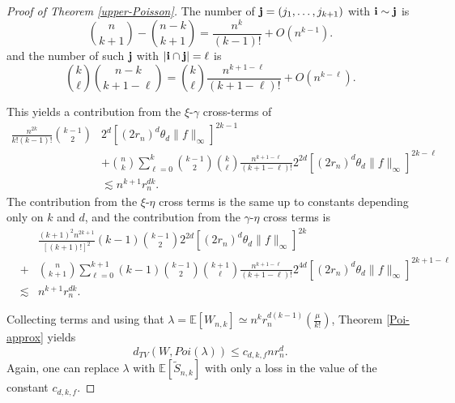 \documentclass{amsart}
\theoremstyle{definition}
\newcommand{\E}{\mathbb{E}}
\newcommand{\s}{\widetilde{S}}
\renewcommand{\1}{\mathbb{1}}
\begin{document}
\begin{proof}[Proof of Theorem \ref{upper-Poisson}]
The number of ${\bf j}=(j_1,\ldots,j_{k+1})$ with ${\bf i}\sim{\bf j}$
is
$$\binom{n}{k+1}-\binom{n-k}{k+1}=\frac{n^k}{(k-1)!}+O(n^{k-1}).$$
and the number of such ${\bf j}$ with $|{\bf i}\cap{\bf j}|=\ell$ is
$$\binom{k}{\ell}\binom{n-k}{k+1-\ell}=\binom{k}{\ell}\frac{n^{k+1-\ell}}{
(k+1-\ell)!}+O(n^{k-\ell}).$$

This yields a contribution from the $\xi$-$\gamma$ cross-terms of
\begin{equation*}\begin{split}
\frac{n^{2k}}{k!(k-1)!}\binom{k-1}{2}&2^d\left[(2r_n)^d\theta_d\|f\|_\infty
\right]^{2k-1}\\&+\binom{n}{k}\sum_{\ell=0}^k\binom{k-1}{2}\binom{k}{\ell}
\frac{n^{k+1-\ell}}{(k+1-\ell)!}2^{2d}\left[(2r_n)^d\theta_d\|f\|_\infty
\right]^{2k-\ell}\\&\lesssim n^{k+1}r_n^{dk}.
\end{split}\end{equation*}
The contribution from the $\xi$-$\eta$ cross terms is the same up to
constants depending only on $k$ and $d$, and the contribution from the 
$\gamma$-$\eta$ cross terms is 
\begin{eqnarray*}
 & &\frac{(k+1)^2n^{2k+1}}{[(k+1)!]^2}(k-1)\binom{k-1}{2}2^{2d}\left[(2r_n)^d
\theta_d\|f\|_\infty\right]^{2k}\\
&+&\binom{n}{k+1}\sum_{\ell=0}^{k+1}
(k-1)\binom{k-1}{2}\binom{k+1}{\ell}\frac{n^{k+1-\ell}}{(k+1-\ell)!}
2^{4d}\left[(2r_n)^d\theta_d
\|f\|_\infty\right]^{2k+1-\ell}\\
&\lesssim & n^{k+1}r_n^{dk}.
\end{eqnarray*}


Collecting terms and using that $\lambda=
\E[W_{n,k}]\simeq n^kr_n^{d(k-1)}
\left(\frac{\mu}{k!}\right)$, Theorem \ref{Poi-approx} yields
$$d_{TV}(W,Poi(\lambda))\le c_{d,k,f}nr_n^d.$$
Again, one can replace $\lambda$ with $\E[\s_{n,k}]$ with only a loss in the 
value of the constant $c_{d,k,f}$.

\end{proof}
\end{document}

